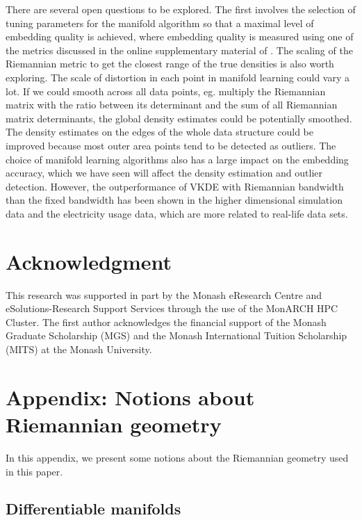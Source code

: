 \documentclass[11pt,a4paper,]{article}
\begin{document}
There are several open questions to be explored. The first involves the selection of tuning parameters for the manifold algorithm so that a maximal level of embedding quality is achieved, where embedding quality is measured using one of the metrics discussed in the online supplementary material of \textcite{Cheng2021-ex}. The scaling of the Riemannian metric to get the closest range of the true densities is also worth exploring. The scale of distortion in each point in manifold learning could vary a lot. If we could smooth across all data points, eg. multiply the Riemannian matrix with the ratio between its determinant
and the sum of all Riemannian matrix determinants, the global density estimates could be potentially smoothed. The density estimates on the edges of the whole data structure could be improved because most outer area points tend to be detected as outliers. The choice of manifold learning algorithms also has a large impact on the embedding accuracy, which we have seen will affect the density estimation and outlier detection. However, the outperformance of VKDE with Riemannian bandwidth than the fixed bandwidth has been shown in the higher dimensional simulation data and the electricity usage data, which are more related
to real-life data sets.

\hypertarget{acknowledgment}{%
\section*{Acknowledgment}\label{acknowledgment}}

This research was supported in part by the Monash eResearch Centre and eSolutions-Research Support Services through the use of the MonARCH HPC Cluster. The first author acknowledges the financial support of the Monash Graduate Scholarship (MGS) and the Monash International Tuition Scholarship (MITS) at the Monash University.

\clearpage\appendix

\hypertarget{riemgeo}{%
\section{Appendix: Notions about Riemannian geometry}\label{riemgeo}}

In this appendix, we present some notions about the Riemannian geometry used in this paper.

\hypertarget{differentiable-manifolds}{%
\subsection{Differentiable manifolds}\label{differentiable-manifolds}}
\end{document}
